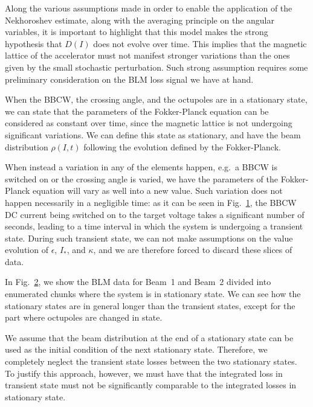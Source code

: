 Along the various assumptions made in order to enable the application of the Nekhoroshev estimate, along with the averaging principle on the angular variables, it is important to highlight that this model makes the strong hypothesis that $D(I)$ does not evolve over time. This implies that the magnetic lattice of the accelerator must not manifest stronger variations than the ones given by the small stochastic perturbation. Such strong assumption requires some preliminary consideration on the BLM loss signal we have at hand.

When the BBCW, the crossing angle, and the octupoles are in a stationary state, we can state that the parameters of the Fokker-Planck equation can be considered as constant over time, since the magnetic lattice is not undergoing significant variations. We can define this state as stationary, and have the beam distribution $\rho(I, t)$ following the evolution defined by the Fokker-Planck.

When instead a variation in any of the elements happen, e.g.\ a BBCW is switched on or the crossing angle is varied, we have the parameters of the Fokker-Planck equation will vary as well into a new value. Such variation does not happen necessarily in a negligible time: as it can be seen in Fig.~\ref{fig:transient-state}, the BBCW DC current being switched on to the target voltage takes a significant number of seconds, leading to a time interval in which the system is undergoing a transient state. During such transient state, we can not make assumptions on the value evolution of $\epsilon$, $I_\ast$, and $\kappa$, and we are therefore forced to discard these slices of data.

\begin{figure}
    \centering
    \caption{}
    \label{fig:transient-state}
\end{figure}

In Fig.~\ref{fig:chunks}, we show the BLM data for Beam~1 and Beam~2 divided into enumerated chunks where the system is in stationary state. We can see how the stationary states are in general longer than the transient states, except for the part where octupoles are changed in state.

\begin{figure}
    \centering
    \caption{}
    \label{fig:chunks}
\end{figure}

We assume that the beam distribution at the end of a stationary state can be used as the initial condition of the next stationary state. Therefore, we completely neglect the transient state losses between the two stationary states. To justify this approach, however, we must have that the integrated loss in transient state must not be significantly comparable to the integrated losses in stationary state.

